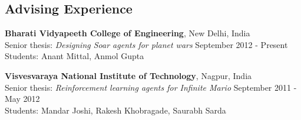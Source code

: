 \documentclass[margin,line,11pt]{res}
\begin{document}
\begin{resume}
                  \section{\sc Advising Experience}
                  \textbf{Bharati Vidyapeeth College of Engineering}, New Delhi, India\\
                  Senior thesis: \emph{Designing Soar agents for planet wars} \hfill September 2012 - Present\\
                  Students: Anant Mittal, Anmol Gupta

                  \textbf{Visvesvaraya National Institute of
                    Technology}, Nagpur, India\\ Senior thesis:
                  \emph{Reinforcement learning agents for Infinite
                    Mario} \hfill September 2011 - May
                  2012\\ Students: Mandar Joshi, Rakesh Khobragade,
                  Saurabh Sarda\\





\end{resume}
\end{document}
